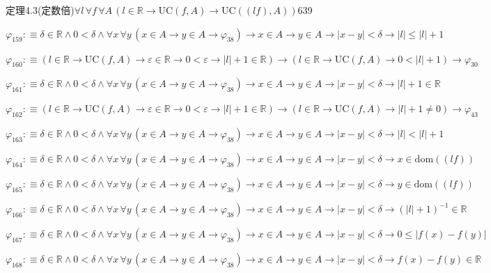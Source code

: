 \begin{fullproof}{定理4.3(定数倍)}{$\forall l\,\forall f\,\forall A\,(l \in \mathbb{R} \to \mathrm{UC}(f,A) \to \mathrm{UC}((l f),A))$}{639}
\begin{abbrevlist}
\item $\varphi_{159} :\equiv \delta \in \mathbb{R} \land 0 < \delta \land \forall x\,\forall y\,(x \in A \to y \in A \to \varphi_{38}) \to x \in A \to y \in A \to \lvert x - y \rvert < \delta \to \lvert l \rvert \leq \lvert l \rvert + 1$
\item $\varphi_{160} :\equiv (l \in \mathbb{R} \to \mathrm{UC}(f,A) \to \varepsilon \in \mathbb{R} \to 0 < \varepsilon \to \lvert l \rvert + 1 \in \mathbb{R}) \to (l \in \mathbb{R} \to \mathrm{UC}(f,A) \to 0 < \lvert l \rvert + 1) \to \varphi_{30}$
\item $\varphi_{161} :\equiv \delta \in \mathbb{R} \land 0 < \delta \land \forall x\,\forall y\,(x \in A \to y \in A \to \varphi_{38}) \to x \in A \to y \in A \to \lvert x - y \rvert < \delta \to \lvert l \rvert + 1 \in \mathbb{R}$
\item $\varphi_{162} :\equiv (l \in \mathbb{R} \to \mathrm{UC}(f,A) \to \varepsilon \in \mathbb{R} \to 0 < \varepsilon \to \lvert l \rvert + 1 \in \mathbb{R}) \to (l \in \mathbb{R} \to \mathrm{UC}(f,A) \to \lvert l \rvert + 1 \neq 0) \to \varphi_{43}$
\item $\varphi_{163} :\equiv \delta \in \mathbb{R} \land 0 < \delta \land \forall x\,\forall y\,(x \in A \to y \in A \to \varphi_{38}) \to x \in A \to y \in A \to \lvert x - y \rvert < \delta \to \lvert l \rvert < \lvert l \rvert + 1$
\item $\varphi_{164} :\equiv \delta \in \mathbb{R} \land 0 < \delta \land \forall x\,\forall y\,(x \in A \to y \in A \to \varphi_{38}) \to x \in A \to y \in A \to \lvert x - y \rvert < \delta \to x \in \mathrm{dom}((l f))$
\item $\varphi_{165} :\equiv \delta \in \mathbb{R} \land 0 < \delta \land \forall x\,\forall y\,(x \in A \to y \in A \to \varphi_{38}) \to x \in A \to y \in A \to \lvert x - y \rvert < \delta \to y \in \mathrm{dom}((l f))$
\item $\varphi_{166} :\equiv \delta \in \mathbb{R} \land 0 < \delta \land \forall x\,\forall y\,(x \in A \to y \in A \to \varphi_{38}) \to x \in A \to y \in A \to \lvert x - y \rvert < \delta \to (\lvert l \rvert + 1)^{-1} \in \mathbb{R}$
\item $\varphi_{167} :\equiv \delta \in \mathbb{R} \land 0 < \delta \land \forall x\,\forall y\,(x \in A \to y \in A \to \varphi_{38}) \to x \in A \to y \in A \to \lvert x - y \rvert < \delta \to 0 \leq \lvert f(x) - f(y) \rvert$
\item $\varphi_{168} :\equiv \delta \in \mathbb{R} \land 0 < \delta \land \forall x\,\forall y\,(x \in A \to y \in A \to \varphi_{38}) \to x \in A \to y \in A \to \lvert x - y \rvert < \delta \to f(x) - f(y) \in \mathbb{R}$

\end{abbrevlist}
\end{fullproof}
